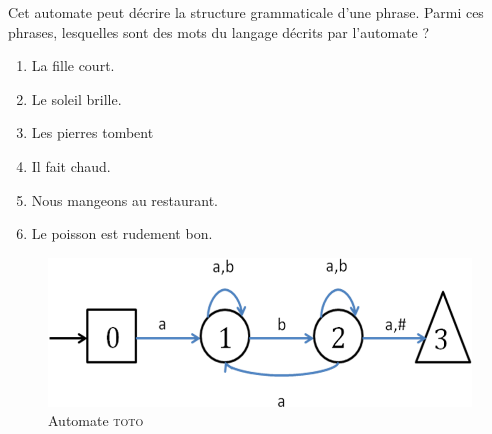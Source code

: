   Cet automate peut décrire la structure grammaticale d'une phrase.
 Parmi ces phrases, lesquelles sont des mots du langage décrits par l'automate ?
\begin{multicols}{2}
\begin{enumerate}
   \item La fille court. 
   \item Le soleil brille. 
   \item Les pierres tombent
   \item Il fait chaud. 
   \item Nous mangeons au restaurant.
   \item Le poisson est rudement bon.
\end{enumerate}
\end{multicols}



\exer

\begin{figure}[h]
\includegraphics[width=.6\textwidth]{images/TD1_5.png}
\caption{Automate \textsc{toto}}
\end{figure}

